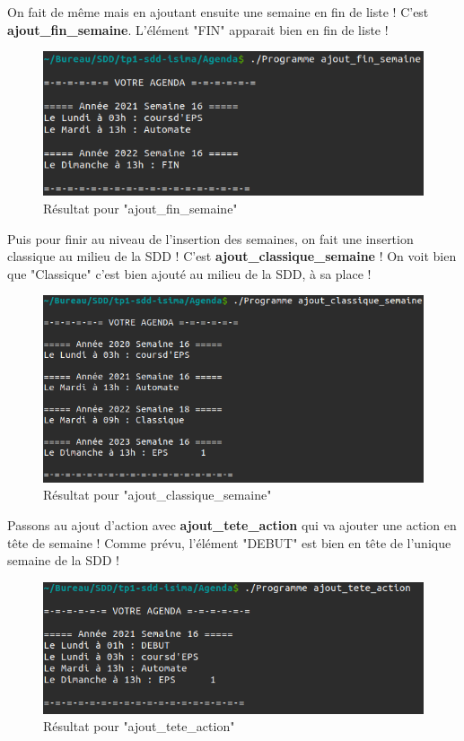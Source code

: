 \documentclass[12pt,french]{article} %
\begin{document}
On fait de même mais en ajoutant ensuite une semaine en fin de liste ! C'est \textbf{ajout\_fin\_semaine}. L'élément "FIN" apparait bien en fin de liste !\newline

\begin{figure}[H]
	\includegraphics[scale=0.6]{aj-fsem.png}
	\centering
	\caption{Résultat pour "ajout\_fin\_semaine"}
\end{figure}

Puis pour finir au niveau de l'insertion des semaines, on fait une insertion classique au milieu de la SDD ! C'est \textbf{ajout\_classique\_semaine} ! On voit bien que "Classique" c'est bien ajouté au milieu de la SDD, à sa place !\newline

\begin{figure}[H]
	\includegraphics[scale=0.6]{aj-csem.png}
	\centering
	\caption{Résultat pour "ajout\_classique\_semaine"}
\end{figure}

Passons au ajout d'action avec \textbf{ajout\_tete\_action} qui va ajouter une action en tête de semaine ! Comme prévu, l'élément "DEBUT" est bien en tête de l'unique semaine de la SDD !\newline

\begin{figure}[H]
	\includegraphics[scale=0.6]{aj-tac.png}
	\centering
	\caption{Résultat pour "ajout\_tete\_action"}
\end{figure}
\end{document}
